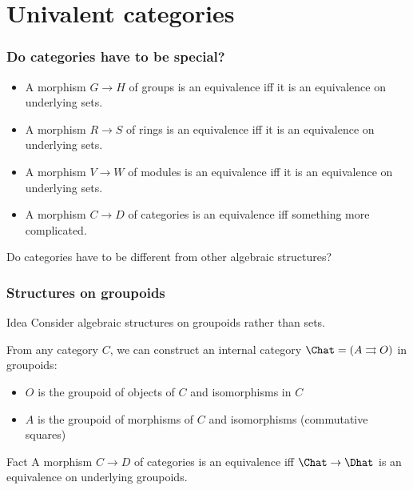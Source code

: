 \documentclass{beamer}
\begin{document}
\section{Univalent categories}
\label{sec:univalence}

\begin{frame}
  \frametitle{Do categories have to be special?}
  \begin{itemize}
  \item A morphism $G\to H$ of groups is an equivalence iff it is an equivalence on underlying sets.
  \item A morphism $R\to S$ of rings is an equivalence iff it is an equivalence on underlying sets.
  \item A morphism $V\to W$ of modules is an equivalence iff it is an equivalence on underlying sets.
  \item A morphism $C\to D$ of categories is an equivalence iff \alert{something more complicated}.
  \end{itemize}
  Do categories have to be different from other algebraic structures?
\end{frame}

\begin{frame}
  \frametitle{Structures on groupoids}
  \begin{block}{Idea}
    Consider algebraic structures on \alert<1>{groupoids} rather than \alert<1>{sets}.
  \end{block}
  From any category $C$, we can construct an internal category $\Chat = (A\toto O)$ in groupoids:
  \begin{itemize}
  \item $O$ is the groupoid of objects of $C$ and isomorphisms in $C$
  \item $A$ is the groupoid of morphisms of $C$ and isomorphisms (commutative squares)
  \end{itemize}
  \pause
  \begin{block}{Fact}
    A morphism $C\to D$ of categories is an equivalence iff $\Chat \to \Dhat$ is an \alert{equivalence on underlying groupoids}.
  \end{block}
\end{frame}
\end{document}
